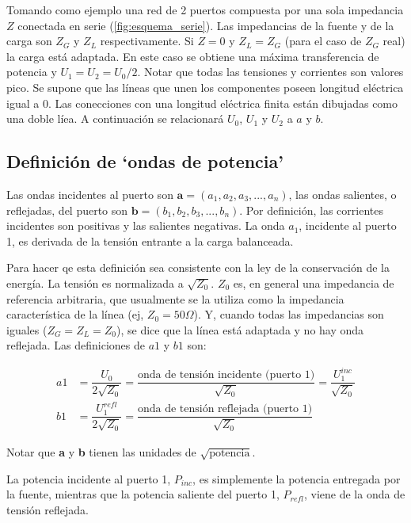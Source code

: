 Tomando como ejemplo una red de 2 puertos compuesta por una sola impedancia $Z$ conectada en serie (\ref{fig:esquema_serie}).
Las impedancias de la fuente y de la carga son $Z_G$ y $Z_L$ respectivamente. Si $Z=0$ y $Z_L = Z_G$ (para el caso de $Z_G$ real) 
la carga está adaptada. En este caso se obtiene una máxima transferencia de potencia y $U_1 = U_2 = U_0/2$. Notar que todas las
tensiones y corrientes son valores pico. Se supone que las líneas que unen los componentes poseen longitud eléctrica igual a 0. 
Las conecciones con una longitud eléctrica finita están dibujadas como una doble líea. A continuación se relacionará $U_0$, $U_1$ 
y $U_2$ a $a$ y $b$.


\subsection{Definición de \enquote*{ondas de potencia}}

Las ondas incidentes al puerto son $\textbf{a}=(a_1, a_2, a_3, ..., a_n)$, las ondas salientes, o reflejadas, del puerto son  
$\textbf{b}=(b_1, b_2, b_3, ..., b_n)$. Por definición, las corrientes incidentes son positivas y las salientes negativas. La
onda $a_1$, incidente al puerto 1, es derivada de la tensión entrante a la carga balanceada. 

Para hacer qe esta definición sea consistente con la ley de la conservación de la energía. La tensión es normalizada a $\sqrt{Z_0}$. 
$Z_0$ es, en general una impedancia de referencia arbitraria, que usualmente se la utiliza como la impedancia característica de la 
línea (ej, $Z_0 = 50 \Omega$). Y, cuando todas las impedancias son iguales ($Z_G = Z_L = Z_0$), se dice que la línea está adaptada
y no hay onda reflejada. Las definiciones de $a1$ y $b1$ son:

\begin{equation}
\begin{aligned}
	a1 &= \dfrac{U_0}{2\sqrt{Z_0}}= \dfrac{\textrm{onda de tensión incidente (puerto 1)}}{\sqrt{Z_0}}=\dfrac{U_1^{inc}}{\sqrt{Z_0}} \\
	b1 &= \dfrac{U_1^{refl}}{2\sqrt{Z_0}}= \dfrac{\textrm{onda de tensión reflejada (puerto 1)}}{\sqrt{Z_0}}
\end{aligned}
\end{equation}

Notar que \textbf{a} y \textbf{b} tienen las unidades de $\sqrt{\textrm{potencia}}$.

La potencia incidente al puerto 1, $P_{inc}$, es simplemente la potencia entregada por la fuente, mientras que la potencia saliente 
del puerto 1, $P_{refl}$, viene de la onda de tensión reflejada.

